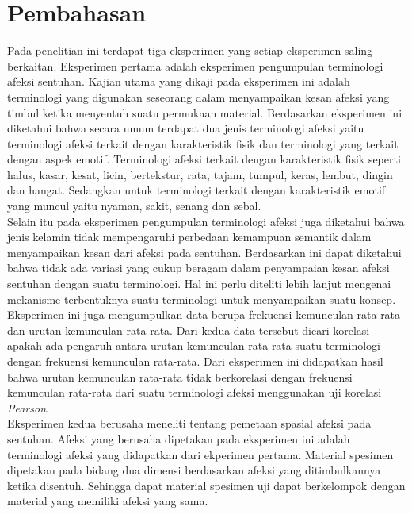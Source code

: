 \documentclass{Jurnal_kolo}
\begin{document}
\begin{multicols}{2}
\begin{table}[H]
\begin{tabular}{|c|c|c|c|}
		\end{tabular}
	\end{table}

	\section{Pembahasan}
	\indent Pada penelitian ini terdapat tiga eksperimen yang setiap eksperimen saling berkaitan. Eksperimen pertama adalah eksperimen pengumpulan terminologi afeksi sentuhan. Kajian utama yang dikaji pada eksperimen ini adalah terminologi yang digunakan seseorang dalam menyampaikan kesan afeksi yang timbul ketika menyentuh suatu permukaan material. Berdasarkan eksperimen ini diketahui bahwa secara umum terdapat dua jenis terminologi afeksi yaitu terminologi afeksi terkait dengan karakteristik fisik dan terminologi yang terkait dengan aspek emotif. Terminologi afeksi terkait dengan karakteristik fisik seperti halus, kasar, kesat, licin, bertekstur, rata, tajam, tumpul, keras, lembut, dingin dan hangat. Sedangkan untuk terminologi terkait dengan karakteristik emotif yang muncul yaitu nyaman, sakit, senang dan sebal.\\
	\indent Selain itu pada eksperimen pengumpulan terminologi afeksi juga diketahui bahwa jenis kelamin tidak mempengaruhi perbedaan kemampuan semantik dalam menyampaikan kesan dari afeksi pada sentuhan. Berdasarkan ini dapat diketahui bahwa tidak ada variasi yang cukup beragam dalam penyampaian kesan afeksi sentuhan dengan suatu terminologi. Hal ini perlu diteliti lebih lanjut mengenai mekanisme terbentuknya suatu terminologi untuk menyampaikan suatu konsep.\\
	\indent Eksperimen ini juga mengumpulkan data berupa frekuensi kemunculan rata-rata dan urutan kemunculan rata-rata. Dari kedua data tersebut dicari korelasi apakah ada pengaruh antara urutan kemunculan rata-rata suatu terminologi dengan frekuensi kemunculan rata-rata. Dari eksperimen ini didapatkan hasil bahwa urutan kemunculan rata-rata tidak berkorelasi dengan frekuensi kemunculan rata-rata dari suatu terminologi afeksi menggunakan uji korelasi \emph{Pearson}.\\
	\indent Eksperimen kedua berusaha meneliti tentang pemetaan spasial afeksi pada sentuhan. Afeksi yang berusaha dipetakan pada eksperimen ini adalah terminologi afeksi yang didapatkan dari ekperimen pertama. Material spesimen dipetakan pada bidang dua dimensi berdasarkan afeksi yang ditimbulkannya ketika disentuh. Sehingga dapat material spesimen uji dapat berkelompok dengan material yang memiliki afeksi yang sama.\\

\end{multicols}
\end{document}
